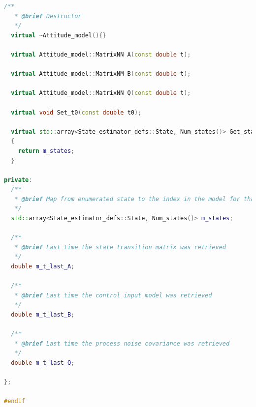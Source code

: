 \documentclass[applsci,article,submit,pdftex,moreauthors]{Definitions/mdpi}
\begin{document}
\begin{lstlisting}[language=c++]
  /**
   * @brief Destructor
   */
  virtual ~Attitude_model(){}

  virtual Attitude_model::MatrixNN A(const double t);

  virtual Attitude_model::MatrixNM B(const double t);

  virtual Attitude_model::MatrixNN Q(const double t);

  virtual void Set_t0(const double t0);

  virtual std::array<State_estimator_defs::State, Num_states()> Get_states() const
  {
    return m_states;
  }

private:
  /**
   * @brief Map from enumerated state to the index in the model for that state
   */
  std::array<State_estimator_defs::State, Num_states()> m_states;

  /**
   * @brief Last time the state transition matrix was retrieved
   */
  double m_t_last_A;

  /**
   * @brief Last time the control input model was retrieved
   */
  double m_t_last_B;

  /**
   * @brief Last time the process noise covariance was retrieved
   */
  double m_t_last_Q;

};

#endif

\end{lstlisting}
\end{document}
